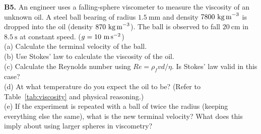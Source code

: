 \begin{exercisebox}[12]
\vspace{0.4cm}

\textbf{B5.} An engineer uses a falling-sphere
viscometer to measure the viscosity of an unknown oil.
A steel ball bearing of radius $1.5\ \text{mm}$
and density $7800\ \text{kg\,m}^{-3}$ is dropped into
the oil (density $870\ \text{kg\,m}^{-3}$).
The ball is observed to fall $20\ \text{cm}$ in
$8.5\ \text{s}$ at constant speed.
($g = 10\ \text{m\,s}^{-2}$)\\[4pt]
(a) Calculate the terminal velocity of the ball.\\
(b) Use Stokes' law to calculate the viscosity of
the oil.\\
(c) Calculate the Reynolds number using
$Re = \rho_f v d/\eta$. Is Stokes' law valid in
this case?\\
(d) At what temperature do you expect the oil to
be? (Refer to Table~\ref{tab:viscosity} and
physical reasoning.)\\
(e) If the experiment is repeated with a ball of
twice the radius (keeping everything else the same),
what is the new terminal velocity? What does this
imply about using larger spheres in viscometry?
\hfill{}

\end{exercisebox}

